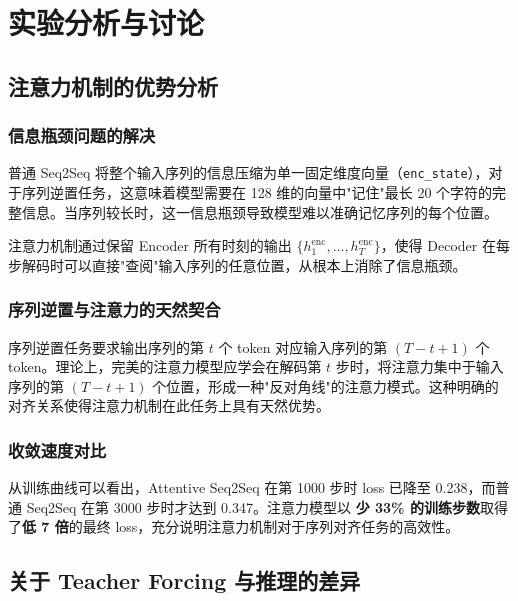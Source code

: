 \documentclass[12pt, a4paper]{article}
\begin{document}
\section{实验分析与讨论}

\subsection{注意力机制的优势分析}

\subsubsection{信息瓶颈问题的解决}

普通 Seq2Seq 将整个输入序列的信息压缩为单一固定维度向量（\texttt{enc\_state}），对于序列逆置任务，这意味着模型需要在 128 维的向量中"记住"最长 20 个字符的完整信息。当序列较长时，这一信息瓶颈导致模型难以准确记忆序列的每个位置。

注意力机制通过保留 Encoder 所有时刻的输出 $\{h_1^{\text{enc}}, \ldots, h_T^{\text{enc}}\}$，使得 Decoder 在每步解码时可以直接"查阅"输入序列的任意位置，从根本上消除了信息瓶颈。

\subsubsection{序列逆置与注意力的天然契合}

序列逆置任务要求输出序列的第 $t$ 个 token 对应输入序列的第 $(T-t+1)$ 个 token。理论上，完美的注意力模型应学会在解码第 $t$ 步时，将注意力集中于输入序列的第 $(T-t+1)$ 个位置，形成一种"反对角线"的注意力模式。这种明确的对齐关系使得注意力机制在此任务上具有天然优势。

\subsubsection{收敛速度对比}

从训练曲线可以看出，Attentive Seq2Seq 在第 1000 步时 loss 已降至 0.238，而普通 Seq2Seq 在第 3000 步时才达到 0.347。注意力模型以 \textbf{少 33\% 的训练步数}取得了\textbf{低 7 倍}的最终 loss，充分说明注意力机制对于序列对齐任务的高效性。

\subsection{关于 Teacher Forcing 与推理的差异}
\end{document}
